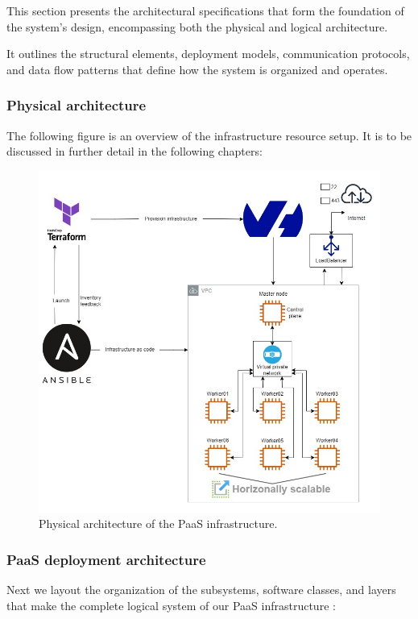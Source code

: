 \hspace{7mm}This section presents the architectural specifications that form the foundation of the system's design, encompassing both the physical and logical architecture.

\hspace{7mm}It outlines the structural elements, deployment models, communication protocols, and data flow patterns that define how the system is organized and operates.

\subsubsection{Physical architecture}

\hspace{7mm}The following figure is an overview of the infrastructure resource setup. It is to be discussed in further detail in the following chapters:

\begin{figure}[H]\centering
\includegraphics[width=1.0\textwidth,angle=00]{assets/f7.jpg}
\caption{Physical architecture of the PaaS infrastructure.}
\label{fig:f7}
\end{figure}

\newpage

\subsubsection{PaaS deployment architecture} 
\hspace{7mm}Next we layout the organization of the subsystems, software classes, and layers that make the complete logical system of our PaaS infrastructure :

